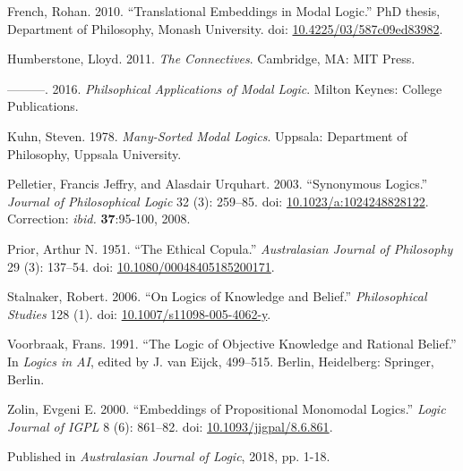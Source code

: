\documentclass[
  11pt,
  letterpaper,
  DIV=11,
  numbers=noendperiod,
  twoside]{scrartcl}
\newlength{\cslhangindent}
\newenvironment{CSLReferences}[2] %
 {\begin{list}{}{%
  \setlength{\itemindent}{0pt}
  \setlength{\leftmargin}{0pt}
  \setlength{\parsep}{0pt}
  \ifodd #1
   \setlength{\leftmargin}{\cslhangindent}
   \setlength{\itemindent}{-1\cslhangindent}
  \fi
  \setlength{\itemsep}{#2\baselineskip}}}
 {\end{list}}
\begin{document}
\label{refs}
\begin{CSLReferences}{1}{0}
French, Rohan. 2010. {``Translational Embeddings in Modal Logic.''} PhD
thesis, Department of Philosophy, Monash University. doi:
\href{https://doi.org/10.4225/03/587c09ed83982}{10.4225/03/587c09ed83982}.

Humberstone, Lloyd. 2011. \emph{The Connectives}. Cambridge, MA: MIT
Press.

---------. 2016. \emph{Philsophical Applications of Modal Logic}. Milton
Keynes: College Publications.

Kuhn, Steven. 1978. \emph{Many-Sorted Modal Logics}. Uppsala: Department
of Philosophy, Uppsala University.

Pelletier, Francis Jeffry, and Alasdair Urquhart. 2003. {``Synonymous
Logics.''} \emph{Journal of Philosophical Logic} 32 (3): 259--85. doi:
\href{https://doi.org/10.1023/a:1024248828122}{10.1023/a:1024248828122}.
Correction: \emph{ibid.} \textbf{37}:95-100, 2008.

Prior, Arthur N. 1951. {``The Ethical Copula.''} \emph{Australasian
Journal of Philosophy} 29 (3): 137--54. doi:
\href{https://doi.org/10.1080/00048405185200171}{10.1080/00048405185200171}.

Stalnaker, Robert. 2006. {``{On Logics of Knowledge and Belief}.''}
\emph{Philosophical Studies} 128 (1). doi:
\href{https://doi.org/10.1007/s11098-005-4062-y}{10.1007/s11098-005-4062-y}.

Voorbraak, Frans. 1991. {``The Logic of Objective Knowledge and Rational
Belief.''} In \emph{Logics in {AI}}, edited by J. van Eijck, 499--515.
Berlin, Heidelberg: Springer, Berlin.

Zolin, Evgeni E. 2000. {``Embeddings of Propositional Monomodal
Logics.''} \emph{Logic Journal of IGPL} 8 (6): 861--82. doi:
\href{https://doi.org/10.1093/jigpal/8.6.861}{10.1093/jigpal/8.6.861}.

\end{CSLReferences}



\noindent Published in\emph{
Australasian Journal of Logic}, 2018, pp. 1-18.
\end{document}
